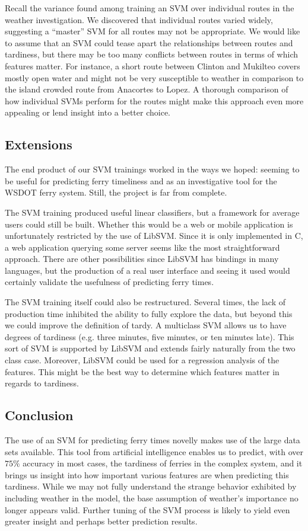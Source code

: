 \documentclass[11pt]{article} %
\begin{document}
Recall the variance found among training an SVM over individual routes in the weather
investigation. We discovered that individual routes varied widely, suggesting a 
``master'' SVM for all routes may not be appropriate. We would like to assume that
an SVM could tease apart the relationships between routes and tardiness, but there
may be too many conflicts between routes in terms of which features matter. For 
instance, a short route between Clinton and Mukilteo covers mostly open water
and might not be very susceptible to weather in comparison to the island crowded
route from Anacortes to Lopez. A thorough comparison of how individual SVMs 
perform for the routes might make this approach even more appealing or lend 
insight into a better choice.


\subsection{Extensions}
\label{sec:extensions}
The end product of our SVM trainings worked in the ways we hoped: seeming to be 
useful for predicting ferry timeliness and as an investigative tool for the
WSDOT ferry system. Still, the project is far from complete. 

The SVM training produced useful linear classifiers, but a framework for average
users could still be built. Whether this would be a web or mobile application is
unfortunately restricted by the use of LibSVM. Since it is only implemented in 
C, a web application querying some server seems like the most straightforward
approach. There are other possibilities since LibSVM has bindings in many languages,
but the production of a real user interface and seeing it used would certainly 
validate the usefulness of predicting ferry times.

The SVM training itself could also be restructured. Several times, the lack of
production time inhibited the ability to fully explore the data, but beyond this
we could improve the definition of tardy. A multiclass SVM allows us to have degrees
of tardiness (e.g. three minutes, five minutes, or ten minutes late). This sort
of SVM is supported by LibSVM and extends fairly naturally from the two class case.
Moreover, LibSVM could be used for a regression analysis of the features. This might
be the best way to determine which features matter in regards to tardiness. 
 
\subsection{Conclusion}
\label{sec:conclusion}
The use of an SVM for predicting ferry times novelly makes use of the large data 
sets available. This tool from artificial intelligence enables us to predict, with
over $75\%$ accuracy in most cases, the tardiness of ferries in the complex system,
and it brings us insight into how important various features are when predicting
this tardiness. While we may not fully understand the strange behavior exhibited
by including weather in the model, the base assumption of weather's importance no 
longer appears valid. Further tuning of the SVM process is likely to yield even
greater insight and perhaps better prediction results.

\newpage 



\end{document}
